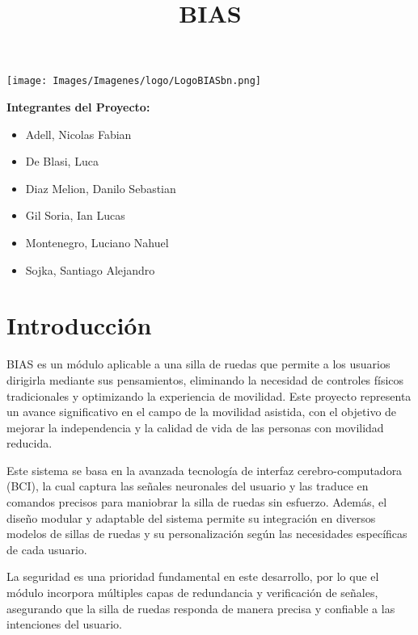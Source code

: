 \documentclass{article}
\date{}
\begin{document}
 

\begin{center}
    \texttt{[image: Images/Imagenes/logo/LogoBIASbn.png]}\\ 
\end{center}
    
\title{BIAS} 

\vspace{1cm} 

\textbf{Integrantes del Proyecto:} 

\begin{itemize}
    \item Adell, Nicolas Fabian
    \item De Blasi, Luca
    \item Diaz Melion, Danilo Sebastian
    \item Gil Soria, Ian Lucas
    \item Montenegro, Luciano Nahuel
    \item Sojka, Santiago Alejandro
\end{itemize}

\tableofcontents 

\newpage 

\section{Introducción}

BIAS es un módulo aplicable a una silla de ruedas que permite a los usuarios dirigirla mediante sus pensamientos, eliminando la necesidad de controles físicos tradicionales y optimizando la experiencia de movilidad. Este proyecto representa un avance significativo en el campo de la movilidad asistida, con el objetivo de mejorar la independencia y la calidad de vida de las personas con movilidad reducida.

Este sistema se basa en la avanzada tecnología de interfaz cerebro-computadora (BCI), la cual captura las señales neuronales del usuario y las traduce en comandos precisos para maniobrar la silla de ruedas sin esfuerzo. Además, el diseño modular y adaptable del sistema permite su integración en diversos modelos de sillas de ruedas y su personalización según las necesidades específicas de cada usuario. 

La seguridad es una prioridad fundamental en este desarrollo, por lo que el módulo incorpora múltiples capas de redundancia y verificación de señales, asegurando que la silla de ruedas responda de manera precisa y confiable a las intenciones del usuario. 
\end{document}
